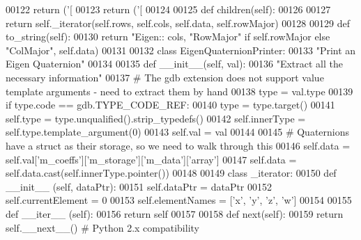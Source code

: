 \begin{DoxyCode}
{00122                 \textcolor{keywordflow}{return} (\textcolor{stringliteral}{'[%
00123             \textcolor{keywordflow}{return} (\textcolor{stringliteral}{'[%
00124             
00125     \textcolor{keyword}{def }children(self):
00126         
00127         \textcolor{keywordflow}{return} self.\_iterator(self.rows, self.cols, self.data, self.rowMajor)
00128         
00129     \textcolor{keyword}{def }to\_string(self):
00130         \textcolor{keywordflow}{return} \textcolor{stringliteral}{"Eigen::%
      cols, \textcolor{stringliteral}{"RowMajor"} \textcolor{keywordflow}{if} self.rowMajor \textcolor{keywordflow}{else}  \textcolor{stringliteral}{"ColMajor"}, self.data)
00131 
00132 \textcolor{keyword}{class }EigenQuaternionPrinter:
00133     \textcolor{stringliteral}{"Print an Eigen Quaternion"}
00134     
00135     \textcolor{keyword}{def }\_\_init\_\_(self, val):
00136         \textcolor{stringliteral}{"Extract all the necessary information"}
00137         \textcolor{comment}{# The gdb extension does not support value template arguments - need to extract them by hand}
00138         type = val.type
00139         \textcolor{keywordflow}{if} type.code == gdb.TYPE\_CODE\_REF:
00140             type = type.target()
00141         self.type = type.unqualified().strip\_typedefs()
00142         self.innerType = self.type.template\_argument(0)
00143         self.val = val
00144         
00145         \textcolor{comment}{# Quaternions have a struct as their storage, so we need to walk through this}
00146         self.data = self.val[\textcolor{stringliteral}{'m\_coeffs'}][\textcolor{stringliteral}{'m\_storage'}][\textcolor{stringliteral}{'m\_data'}][\textcolor{stringliteral}{'array'}]
00147         self.data = self.data.cast(self.innerType.pointer())
00148             
00149     \textcolor{keyword}{class }\_iterator:
00150         \textcolor{keyword}{def }\_\_init\_\_ (self, dataPtr):
00151             self.dataPtr = dataPtr
00152             self.currentElement = 0
00153             self.elementNames = [\textcolor{stringliteral}{'x'}, \textcolor{stringliteral}{'y'}, \textcolor{stringliteral}{'z'}, \textcolor{stringliteral}{'w'}]
00154             
00155         \textcolor{keyword}{def }\_\_iter\_\_ (self):
00156             \textcolor{keywordflow}{return} self
00157     
00158         \textcolor{keyword}{def }next(self):
00159                         \textcolor{keywordflow}{return} self.\_\_next\_\_()  \textcolor{comment}{# Python 2.x compatibility}
}}}}
\end{DoxyCode}
